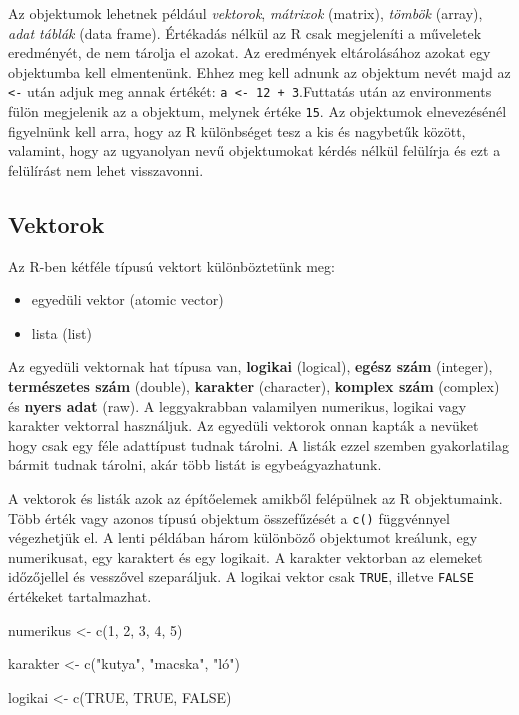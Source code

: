 \documentclass[
]{book}
\newenvironment{Shaded}{\begin{snugshade}}{\end{snugshade}}
\newcommand{\ConstantTok}[1]{\textcolor[rgb]{0.00,0.00,0.00}{#1}}
\newcommand{\DecValTok}[1]{\textcolor[rgb]{0.00,0.00,0.81}{#1}}
\newcommand{\FunctionTok}[1]{\textcolor[rgb]{0.00,0.00,0.00}{#1}}
\newcommand{\NormalTok}[1]{#1}
\newcommand{\OtherTok}[1]{\textcolor[rgb]{0.56,0.35,0.01}{#1}}
\newcommand{\StringTok}[1]{\textcolor[rgb]{0.31,0.60,0.02}{#1}}
\providecommand{\tightlist}{%
  \setlength{\itemsep}{0pt}\setlength{\parskip}{0pt}}
\begin{document}
Az objektumok lehetnek például \emph{vektorok}, \emph{mátrixok}
(matrix), \emph{tömbök} (array), \emph{adat táblák} (data frame).
Értékadás nélkül az R csak megjeleníti a műveletek eredményét, de nem
tárolja el azokat. Az eredmények eltárolásához azokat egy objektumba
kell elmentenünk. Ehhez meg kell adnunk az objektum nevét majd az
\texttt{\textless{}-} után adjuk meg annak értékét:
\texttt{a\ \textless{}-\ 12\ +\ 3}.Futtatás után az environments fülön
megjelenik az a objektum, melynek értéke \texttt{15}. Az objektumok
elnevezésénél figyelnünk kell arra, hogy az R különbséget tesz a kis és
nagybetűk között, valamint, hogy az ugyanolyan nevű objektumokat kérdés
nélkül felülírja és ezt a felülírást nem lehet visszavonni.

\hypertarget{vektorok}{%
\subsection{Vektorok}\label{vektorok}}

Az R-ben kétféle típusú vektort különböztetünk meg:

\begin{itemize}
\tightlist
\item
  egyedüli vektor (atomic vector)
\item
  lista (list)
\end{itemize}

Az egyedüli vektornak hat típusa van, \textbf{logikai} (logical),
\textbf{egész szám} (integer), \textbf{természetes szám} (double),
\textbf{karakter} (character), \textbf{komplex szám} (complex) és
\textbf{nyers adat} (raw). A leggyakrabban valamilyen numerikus, logikai
vagy karakter vektorral használjuk. Az egyedüli vektorok onnan kapták a
nevüket hogy csak egy féle adattípust tudnak tárolni. A listák ezzel
szemben gyakorlatilag bármit tudnak tárolni, akár több listát is
egybeágyazhatunk.

A vektorok és listák azok az építőelemek amikből felépülnek az R
objektumaink. Több érték vagy azonos típusú objektum összefűzését a
\texttt{c()} függvénnyel végezhetjük el. A lenti példában három
különböző objektumot kreálunk, egy numerikusat, egy karaktert és egy
logikait. A karakter vektorban az elemeket időzőjellel és vesszővel
szeparáljuk. A logikai vektor csak \texttt{TRUE}, illetve \texttt{FALSE}
értékeket tartalmazhat.

\begin{Shaded}
\begin{Highlighting}[]
\NormalTok{numerikus }\OtherTok{\textless{}{-}} \FunctionTok{c}\NormalTok{(}\DecValTok{1}\NormalTok{, }\DecValTok{2}\NormalTok{, }\DecValTok{3}\NormalTok{, }\DecValTok{4}\NormalTok{, }\DecValTok{5}\NormalTok{)}

\NormalTok{karakter }\OtherTok{\textless{}{-}} \FunctionTok{c}\NormalTok{(}\StringTok{"kutya"}\NormalTok{, }\StringTok{"macska"}\NormalTok{, }\StringTok{"ló"}\NormalTok{)}

\NormalTok{logikai }\OtherTok{\textless{}{-}} \FunctionTok{c}\NormalTok{(}\ConstantTok{TRUE}\NormalTok{, }\ConstantTok{TRUE}\NormalTok{, }\ConstantTok{FALSE}\NormalTok{)}
\end{Highlighting}
\end{Shaded}
\end{document}
